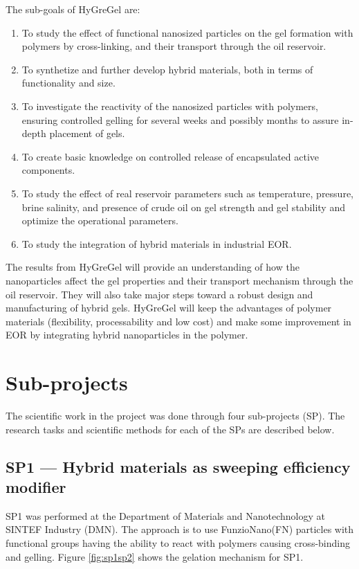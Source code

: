 The sub-goals of HyGreGel are:
\begin{enumerate}
    \item To study the effect of functional nanosized particles on the gel formation with polymers by cross-linking, and their transport through the oil reservoir.
    \item To synthetize and further develop  hybrid materials, both in terms of functionality and size.
    \item To investigate the reactivity of the nanosized particles with polymers, ensuring controlled gelling for several weeks and possibly months to assure in-depth placement of gels.
    \item To create basic knowledge on controlled release of encapsulated active components.
    \item To study the effect of real reservoir parameters such as temperature, pressure, brine salinity, and presence of crude oil on gel strength and gel stability and optimize the operational parameters.
    \item To study the integration of hybrid materials in industrial EOR.
\end{enumerate}

The results from HyGreGel will provide an understanding of how the nanoparticles affect the gel properties and their transport mechanism through the oil reservoir. They will also take major steps toward a robust design and manufacturing of hybrid gels. HyGreGel will keep the advantages of polymer materials (flexibility, processability and low cost) and make some improvement in EOR by integrating hybrid nanoparticles in the polymer. 

\section{Sub-projects}
The scientific work in the project was done through four sub-projects (SP). The research tasks and scientific methods for each of the SPs are described below.

\subsection*{SP1 --- Hybrid materials as sweeping efficiency modifier}
%

SP1 was performed at the Department of Materials and Nanotechnology at SINTEF Industry (DMN). The approach is to use FunzioNano\texttrademark (FN) particles with functional groups having the ability to react with polymers causing cross-binding and gelling. Figure \ref{fig:sp1sp2} shows the gelation mechanism for SP1.

